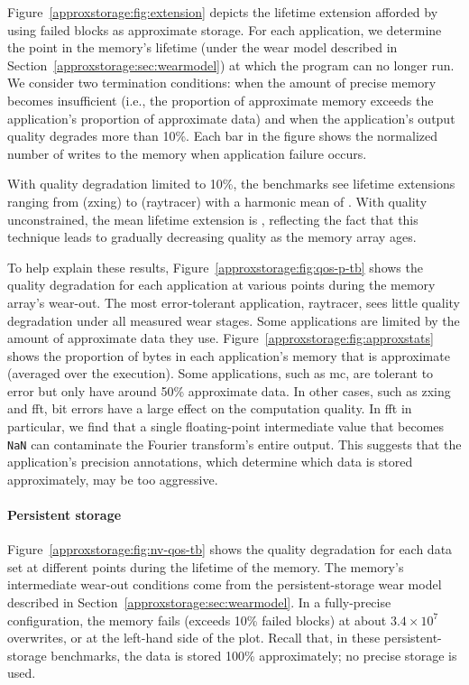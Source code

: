 Figure~\ref{approxstorage:fig:extension} depicts the lifetime extension afforded by
using failed blocks as approximate storage. For
each application, we determine the point in the memory's lifetime
(under the wear model described in Section~\ref{approxstorage:sec:wearmodel}) at
which the program can no longer run. We consider two termination
conditions: when the amount of
precise memory becomes insufficient (i.e., the proportion of
approximate memory exceeds the application's proportion of approximate
data) and when the application's output quality degrades more than 10\%. Each bar in
the figure shows the normalized number of writes to the memory when
application failure occurs.

With quality degradation limited to 10\%, the benchmarks see lifetime
extensions ranging from  (\textsf{zxing}) to
 (\textsf{raytracer}) with
a harmonic mean of . With quality unconstrained, the mean lifetime
extension is , reflecting the fact that this technique leads to gradually
decreasing quality as the memory array ages.

To help explain these results, Figure~\ref{approxstorage:fig:qos-p-tb} shows the quality
degradation for each application at various points during the memory array's
wear-out.
The most error-tolerant application, \textsf{raytracer}, sees
little quality degradation under all measured wear stages.
Some applications are limited by the amount of approximate data they use.
Figure~\ref{approxstorage:fig:approxstats} shows the proportion of bytes in each
application's memory that is approximate (averaged over the execution).
Some applications,
such as \textsf{mc}, are tolerant to error but only have around 50\%
approximate data. In other
cases, such as \textsf{zxing} and \textsf{fft}, bit errors
have a large effect on the computation quality. In \textsf{fft} in
particular, we find that a single floating-point intermediate value that
becomes \verb+NaN+ can contaminate the Fourier transform's entire output.
This suggests that the application's precision
annotations, which determine which data is stored approximately, may be
too aggressive.

\paragraph{Persistent storage}

Figure~\ref{approxstorage:fig:nv-qos-tb} shows the quality degradation for each data set at
different points during the lifetime of the memory.
The memory's intermediate
wear-out conditions come from the persistent-storage wear model described in
Section~\ref{approxstorage:sec:wearmodel}.
In a fully-precise configuration, the memory fails (exceeds 10\% failed blocks)
at about $3.4 \times 10^{7}$ overwrites, or at the left-hand side of the plot.
Recall that, in these persistent-storage benchmarks, the data is stored 100\%
approximately; no precise storage is used.

